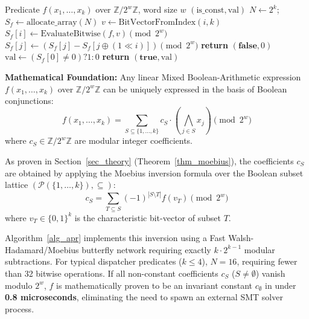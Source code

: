 \documentclass[11pt,a4paper]{article}
\begin{document}
\begin{algorithm}[!t]
\caption{Bit-Parallel Algebraic Pre-Reduction (APR) Filter}
\label{alg_apr}
\begin{algorithmic}[1]
\REQUIRE Predicate $f(x_1, \dots, x_k)$ over $\mathbb{Z}/2^w\mathbb{Z}$, word size $w$
\ENSURE $(\text{is\_const}, \text{val})$
\STATE $N \leftarrow 2^k$; $S_f \leftarrow \text{allocate\_array}(N)$
    \STATE $v \leftarrow \text{BitVectorFromIndex}(i, k)$
    \STATE $S_f[i] \leftarrow \text{EvaluateBitwise}(f, v) \pmod{2^w}$
\ENDFOR
{}
            \STATE $S_f[j] \leftarrow (S_f[j] - S_f[j \oplus (1 \ll i)]) \pmod{2^w}$
        \ENDIF
    \ENDFOR
\ENDFOR
{}
        \STATE \textbf{return} $(\textbf{false}, 0)$
    \ENDIF
\ENDFOR
\STATE $\text{val} \leftarrow (S_f[0] \neq 0) ? 1 : 0$
\STATE \textbf{return} $(\textbf{true}, \text{val})$
\end{algorithmic}
\end{algorithm}

\textbf{Mathematical Foundation:} Any linear Mixed Boolean-Arithmetic expression $f(x_1, \dots, x_k)$ over $\mathbb{Z}/2^w\mathbb{Z}$ can be uniquely expressed in the basis of Boolean conjunctions:
\begin{equation}
f(x_1, \dots, x_k) = \sum_{S \subseteq \{1, \dots, k\}} c_S \cdot \left(\bigwedge_{j \in S} x_j\right) \pmod{2^w}
\end{equation}
where $c_S \in \mathbb{Z}/2^w\mathbb{Z}$ are modular integer coefficients.

As proven in Section~\ref{sec_theory} (Theorem~\ref{thm_moebius}), the coefficients $c_S$ are obtained by applying the Moebius inversion formula over the Boolean subset lattice $(\mathcal{P}(\{1, \dots, k\}), \subseteq)$:
\begin{equation}
c_S = \sum_{T \subseteq S} (-1)^{|S \setminus T|} f(v_T) \pmod{2^w}
\end{equation}
where $v_T \in \{0, 1\}^k$ is the characteristic bit-vector of subset $T$.

Algorithm~\ref{alg_apr} implements this inversion using a Fast Walsh-Hadamard/Moebius butterfly network requiring exactly $k \cdot 2^{k-1}$ modular subtractions. For typical dispatcher predicates ($k \le 4$), $N = 16$, requiring fewer than 32 bitwise operations. If all non-constant coefficients $c_S$ ($S \neq \emptyset$) vanish modulo $2^w$, $f$ is mathematically proven to be an invariant constant $c_\emptyset$ in under \textbf{0.8 microseconds}, eliminating the need to spawn an external SMT solver process.
\end{document}
